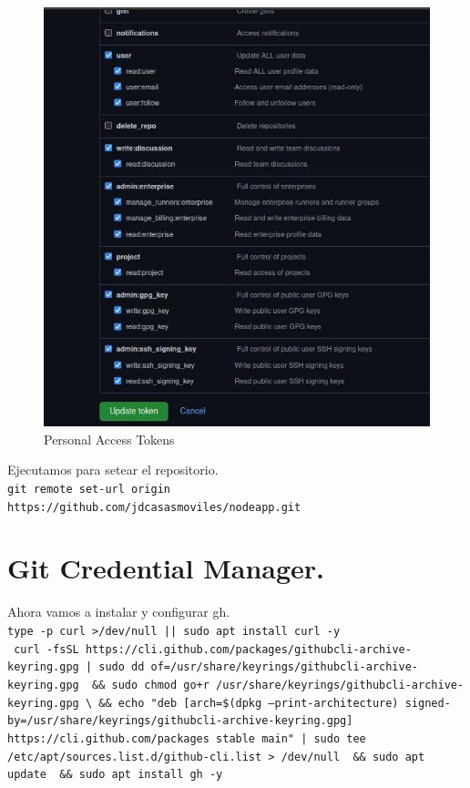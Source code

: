\begin{figure}[H] %
	\centering %
	\includegraphics[scale=0.7]{images/c4_3.jpg}
	\caption{Personal Access Tokens}
\end{figure}
Ejecutamos para setear el repositorio.\\
\texttt{git remote set-url origin https://github.com/jdcasasmoviles/nodeapp.git}\\
\section{Git Credential Manager.}
Ahora vamos a instalar y configurar gh.\\
\texttt{type -p curl >/dev/null || sudo apt install curl -y}\\
\texttt{
curl -fsSL https://cli.github.com/packages/githubcli-archive-keyring.gpg | sudo dd of=/usr/share/keyrings/githubcli-archive-keyring.gpg \
\&\& sudo chmod go+r /usr/share/keyrings/githubcli-archive-keyring.gpg \textbackslash{}
\&\& echo "deb [arch=\$(dpkg --print-architecture) signed-by=/usr/share/keyrings/githubcli-archive-keyring.gpg] https://cli.github.com/packages stable main" | sudo tee /etc/apt/sources.list.d/github-cli.list > /dev/null \
\&\& sudo apt update \
\&\& sudo apt install gh -y
}

